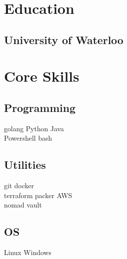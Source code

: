 \documentclass[]{deedy-resume}
\begin{document}
\begin{minipage}[t]{0.33\textwidth} %


\section{Education} 

\subsection{University of Waterloo}



\section{Core Skills}

\subsection{Programming}
golang \textbullet{} Python \textbullet{} Java \\
Powershell \textbullet{} bash \\ 
\sectionsep

\subsection{Utilities}
git \textbullet{} docker \\
terraform \textbullet{} packer \textbullet{} AWS \\
nomad \textbullet{} vault \\
\sectionsep

\subsection{OS}
Linux \textbullet{} Windows \\
\sectionsep



\end{minipage}
\end{document}
